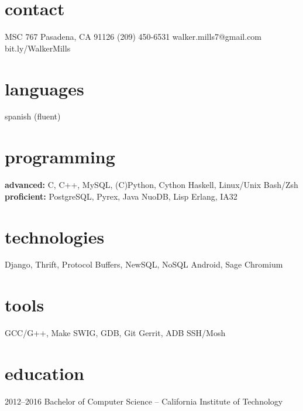 \documentclass[]{mills-cv} %
\begin{document}


\begin{aside} %
\section{contact}
MSC 767
Pasadena, CA 91126
(209) 450-6531
\small walker.mills7@gmail.com
bit.ly/WalkerMills
\section{languages}
spanish (fluent)
\section{programming}
\textbf{advanced:}
C, C++, MySQL,
(C)Python, Cython
Haskell, Linux/Unix
Bash/Zsh
\textbf{proficient:}
PostgreSQL,
Pyrex, Java
NuoDB, Lisp
Erlang, IA32
\section{technologies}
Django, Thrift,
Protocol Buffers,
NewSQL, NoSQL
Android, Sage
Chromium
\section{tools}
GCC/G++, Make
SWIG, GDB, Git
Gerrit, ADB
SSH/Mosh
\end{aside}


\section{education}

\begin{entrylist}
\entry
{2012--2016}
{Bachelor of Computer Science \normalfont -- California Institute of Technology}{}{}
\end{entrylist}
\end{document}
